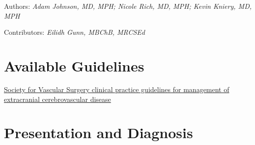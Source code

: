 \documentclass[
]{book}
\begin{document}
Authors: \emph{Adam Johnson, MD, MPH; Nicole Rich, MD, MPH; Kevin
Kniery, MD, MPH}

Contributors: \emph{Eilidh Gunn, MBChB, MRCSEd}

\hypertarget{available-guidelines}{%
\section{Available Guidelines}\label{available-guidelines}}

\href{https://www.jvascsurg.org/article/S0741-5214(21)00893-4/fulltext}{Society for Vascular Surgery clinical practice guidelines for
management of extracranial cerebrovascular
disease}
\citep{aburahmaSocietyVascularSurgery2022}

\hypertarget{presentation-and-diagnosis}{%
\section{Presentation and Diagnosis}\label{presentation-and-diagnosis}}
\end{document}
